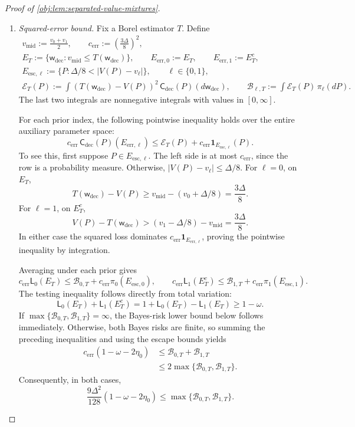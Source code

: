 \documentclass[11pt]{article}
\begin{document}
\begin{proof}[Proof of \cref{obj:lem:separated-value-mixtures}]
\begin{enumerate}
\item \textit{Squared-error bound.}
Fix a Borel estimator \(T\). Define
\[
\begin{gathered}
v_{\mathrm{mid}}:=\frac{v_0+v_1}{2},
\qquad
c_{\mathrm{err}}:=\left(\frac{3\Delta}{8}\right)^2,\\
E_T:=\{\mathsf w_{\mathrm{dec}}:
v_{\mathrm{mid}}\le T(\mathsf w_{\mathrm{dec}})\},
\qquad
E_{\mathrm{err},0}:=E_T,
\qquad
E_{\mathrm{err},1}:=E_T^c,\\
E_{\mathrm{esc},\ell}
:=\{P:\Delta/8<|V(P)-v_\ell|\},
\qquad \ell\in\{0,1\},\\
\mathcal E_T(P)
:=
\int
(T(\mathsf w_{\mathrm{dec}})-V(P))^2\,
\mathsf C_{\mathrm{dec}}(P)(d\mathsf w_{\mathrm{dec}}),
\qquad
\mathcal B_{\ell,T}
:=
\int\mathcal E_T(P)\,\pi_\ell(dP).
\end{gathered}
\]
The last two integrals are nonnegative integrals with values in
\([0,\infty]\).

For each prior index, the following pointwise inequality holds over the entire auxiliary parameter space:
\[
c_{\mathrm{err}}\,
\mathsf C_{\mathrm{dec}}(P)(E_{\mathrm{err},\ell})
\le
\mathcal E_T(P)
+
c_{\mathrm{err}}\mathbf1_{E_{\mathrm{esc},\ell}}(P).
\]
To see this, first suppose \(P\in E_{\mathrm{esc},\ell}\). The left side is at most \(c_{\mathrm{err}}\), since the row is a probability measure. Otherwise,
\(|V(P)-v_\ell|\le\Delta/8\). For \(\ell=0\), on \(E_T\),
\[
T(\mathsf w_{\mathrm{dec}})-V(P)
\ge v_{\mathrm{mid}}-(v_0+\Delta/8)
=\frac{3\Delta}{8}.
\]
For \(\ell=1\), on \(E_T^c\),
\[
V(P)-T(\mathsf w_{\mathrm{dec}})
>
(v_1-\Delta/8)-v_{\mathrm{mid}}
=\frac{3\Delta}{8}.
\]
In either case the squared loss dominates
\(c_{\mathrm{err}}\mathbf1_{E_{\mathrm{err},\ell}}\), proving the pointwise inequality by integration.

Averaging under each prior gives
\[
c_{\mathrm{err}}\mathsf L_0(E_T)
\le\mathcal B_{0,T}+c_{\mathrm{err}}\pi_0(E_{\mathrm{esc},0}),
\qquad
c_{\mathrm{err}}\mathsf L_1(E_T^c)
\le\mathcal B_{1,T}+c_{\mathrm{err}}\pi_1(E_{\mathrm{esc},1}).
\]
The testing inequality follows directly from total variation:
\[
\mathsf L_0(E_T)+\mathsf L_1(E_T^c)
=
1+\mathsf L_0(E_T)-\mathsf L_1(E_T)
\ge1-\omega.
\]
If \(\max\{\mathcal B_{0,T},\mathcal B_{1,T}\}=\infty\), the Bayes-risk lower bound below follows immediately. Otherwise, both Bayes risks are finite, so summing the preceding inequalities and using the escape bounds yields
\[
\begin{aligned}
c_{\mathrm{err}}(1-\omega-2\eta_0)
&\le \mathcal B_{0,T}+\mathcal B_{1,T}\\
&\le2\max\{\mathcal B_{0,T},\mathcal B_{1,T}\}.
\end{aligned}
\]
Consequently, in both cases,
\[
\frac{9\Delta^2}{128}(1-\omega-2\eta_0)
\le\max\{\mathcal B_{0,T},\mathcal B_{1,T}\}.
\]


\end{enumerate}
\end{proof}
\end{document}

